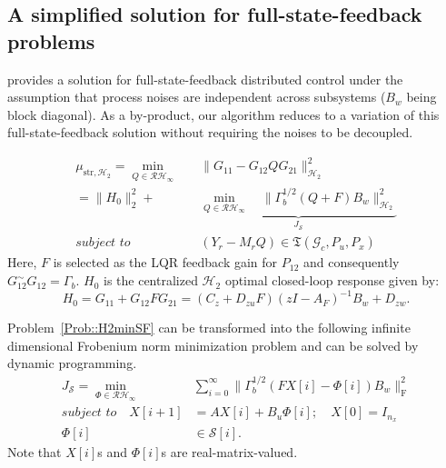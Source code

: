 \subsection{A simplified solution for full-state-feedback problems}
\cite{Lamperski2015StateFB} provides a solution for full-state-feedback distributed control under the assumption that process noises are independent across subsystems (\(B_w\) being block diagonal). As a by-product, our algorithm reduces to a variation of this full-state-feedback solution without requiring the noises to be decoupled. 
\begin{opt}\label{Prob::H2minSF}
\begin{subequations}
\begin{align}
\mu_{\mathrm{str}, \mathcal{H}_2}= \underset{Q\in\mathcal{RH}_\infty}{\min}\quad & \|G_{11} - G_{12} Q G_{21}\|_{\mathcal{H}_2}^2 \\ 
    = \|H_0\|_2^2 + & \underbrace{\min_{Q\in\mathcal{RH}_\infty} \quad \|\Gamma_b^{1/2} (Q + F) B_w\|_{\mathcal{H}_2}^2}_{J_\mathcal{S}} \\
\textit{subject to} \quad & (Y_r - M_r Q)\in\mathfrak{T}(\mathcal{G}_c,P_u,P_x) \label{eqn:SFconst}
\end{align}
\end{subequations}
Here, \(F\) is selected as the LQR feedback gain for \(P_{12}\) and consequently \(G_{12}^\sim G_{12} = \Gamma_b\). \(H_0\) is the centralized \(\mathcal{H}_2\) optimal closed-loop response given by:
\begin{equation*}
H_0 = G_{11} + G_{12} F G_{21} = (C_z + D_{zu} F) (zI-A_F)^{-1} B_w + D_{zw}.
\end{equation*}
\end{opt}

\begin{rem}
Problem~\ref{Prob::H2minSF} can be transformed into the following infinite dimensional Frobenium norm minimization problem and can be solved by dynamic programming.
\begin{subequations}
\begin{align}
J_\mathcal{S} = \min_{\Phi \in\mathcal{RH}_\infty} \quad & \sum_{i = 0}^\infty\|\Gamma_b^{1/2} (F X[i] - \Phi[i]) B_w\|_{\mathrm{F}}^2 \\
\textit{subject to} \quad X[i+1] & =A X[i] + B_u \Phi[i]; \quad X[0] = I_{n_x} \\
\Phi[i] & \in \mathcal{S}[i].
\end{align}
\end{subequations}
Note that \(X[i]\)s and \(\Phi[i]\)s are real-matrix-valued. 
\end{rem}



